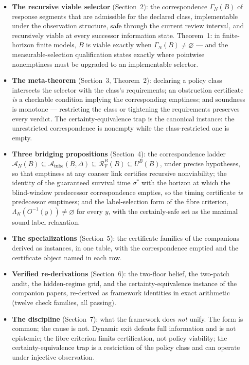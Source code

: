 \documentclass[10pt,twocolumn]{article}
\theoremstyle{definition}
\providecommand{\tightlist}{\setlength{\itemsep}{0pt}\setlength{\parskip}{0pt}}
\begin{document}
\begin{itemize}\tightlist
\item \textbf{The recursive viable selector} (Section~2): the correspondence
\(\Gamma_{N}(B)\) of response segments that are admissible for the declared
class, implementable under the observation structure, safe through the
current review interval, and recursively viable at every successor
information state. Theorem~1: in finite-horizon finite models,
\(B\) is viable exactly when \(\Gamma_{N}(B) \neq \varnothing\) --- and the
measurable-selection qualification states exactly where pointwise
nonemptiness must be upgraded to an implementable selector.
\item \textbf{The meta-theorem} (Section~3, Theorem~2): declaring a policy
class intersects the selector with the class's requirements; an obstruction
certificate \emph{is} a checkable condition implying the corresponding
emptiness; and soundness is monotone --- restricting the class or tightening
the requirements preserves every verdict. The certainty-equivalence trap is
the canonical instance: the unrestricted correspondence is nonempty while the
class-restricted one is empty.
\item \textbf{Three bridging propositions} (Section~4): the correspondence
ladder
\(\mathcal{A}_{N}(B) \subseteq \mathcal{A}_{\mathrm{tube}}(B,\Delta)
\subseteq \mathcal{R}^{B}_{\mathcal{V}}(B) \subseteq U^{B}(B)\), under
precise hypotheses, so that emptiness at any coarser link certifies
recursive nonviability; the identity of the guaranteed survival time
\(\sigma^{*}\) with the horizon at which the blind-window predecessor
correspondence empties, so the timing certificate \emph{is} predecessor
emptiness; and the label-selection form of the fibre criterion,
\(\Lambda_{K}(O^{-1}(y)) \neq \varnothing\) for every \(y\), with the
certainly-safe set as the maximal sound label relaxation.
\item \textbf{The specializations} (Section~5): the certificate families of
the companions derived as instances, in one table, with the correspondence
emptied and the certificate object named in each row.
\item \textbf{Verified re-derivations} (Section~6): the two-floor belief, the
two-patch audit, the hidden-regime grid, and the certainty-equivalence
instance of the companion papers, re-derived as framework identities in
exact arithmetic (twelve check families, all passing).
\item \textbf{The discipline} (Section~7): what the framework does
\emph{not} unify. The form is common; the cause is not. Dynamic exit defeats
full information and is not epistemic; the fibre criterion limits
certification, not policy viability; the certainty-equivalence trap is a
restriction of the policy class and can operate under injective observation.
\end{itemize}
\end{document}
